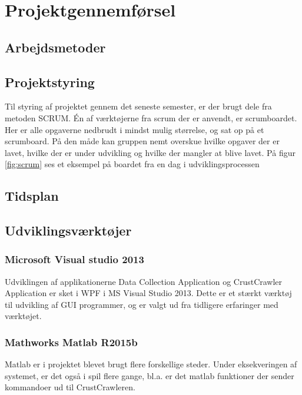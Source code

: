 \thispagestyle{fancy}
\chapter{Projektgennemførsel}
\label{chp:projektgennemforsel}

\section{Arbejdsmetoder}
\label{sec:arbejdsmetoder}

\section{Projektstyring}
\label{sec:projektstyring}

Til styring af projektet gennem det seneste semester, er der brugt dele fra metoden SCRUM.
Én af værktøjerne fra scrum der er anvendt, er scrumboardet. Her er alle opgaverne nedbrudt i mindst mulig størrelse, og sat op på et scrumboard. På den måde kan gruppen nemt overskue hvilke opgaver der er lavet, hvilke der er under udvikling og hvilke der mangler at blive lavet. På figur \ref{fig:scrum} ses et eksempel på boardet fra en dag i udviklingsprocessen


\section{Tidsplan}
\label{sec:tidsplan}

\section{Udviklingsværktøjer}
\label{sec:Udviklingsvaerktojer}

\subsection*{Microsoft Visual studio 2013}
Udviklingen af applikationerne Data Collection Application og CrustCrawler Application er sket i WPF i MS Visual Studio 2013. Dette er et stærkt værktøj til udvikling af GUI programmer, og er valgt ud fra tidligere erfaringer med værktøjet.

\subsection*{Mathworks Matlab R2015b}
Matlab er i projektet blevet brugt flere forskellige steder. Under eksekveringen af systemet, er det også i spil flere gange, bl.a. er det matlab funktioner der sender kommandoer ud til CrustCrawleren.

